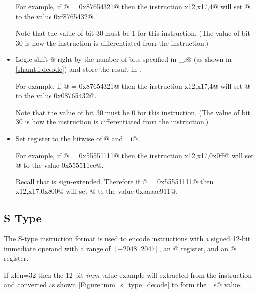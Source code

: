 \begin{itemize}
For example, if @ = \verb@0x87654321@ then the instruction 
\verb@srai x12,x17,4@ will set @ to the value \verb@0xf8765432@.

Note that the value of bit 30 must be 1 for this instruction.
(The value of bit 30 is how the \verb@srai@ instruction is differentiated 
from the \verb@srli@ instruction.)

\item{}
\label{insn:srli}

Logic-shift @ right by the number of bits specified in \verb@shamt_i@ 
(as shown in \autoref{shamt.i:decode})
and store the result in \verb@rd@.

For example, if @ = \verb@0x87654321@ then the instruction 
\verb@srli x12,x17,4@ will set @ to the value \verb@0x08765432@.

Note that the value of bit 30 must be 0 for this instruction.
(The value of bit 30 is how the \verb@srli@ instruction is differentiated 
from the \verb@srai@ instruction.)

\item{}
\label{insn:xori}

Set register \verb@rd@ to the bitwise \verb@xor@ of @ and \verb@imm_i@.

For example, if @ = \verb@0x55551111@ then the instruction 
\verb@xori x12,x17,0x0ff@ will set @ to the value \verb@0x555511ee@.

Recall that \verb@imm@ is sign-extended.
Therefore if @ = \verb@0x55551111@ then 
\verb@xori x12,x17,0x800@ will set @ to the value \verb@0xaaaae911@.

\end{itemize}


\subsection{S Type}
\label{insnformat:stype}

The S-type instruction format is used to encode instructions with a
signed 12-bit immediate operand with a range of $[-2048..2047]$,
an @ register, and an @ register.

If \Gls{xlen}=32 then the 12-bit {\em imm} value example will extracted 
from the instruction and converted as shown \autoref{Figure:imm_s_type_decode}
to form the \verb@imm_s@ value.

